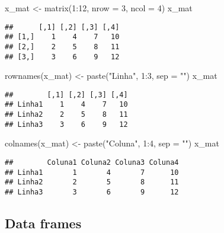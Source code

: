 \documentclass[
]{book}
\newenvironment{Shaded}{\begin{snugshade}}{\end{snugshade}}
\newcommand{\AttributeTok}[1]{\textcolor[rgb]{0.77,0.63,0.00}{#1}}
\newcommand{\DecValTok}[1]{\textcolor[rgb]{0.00,0.00,0.81}{#1}}
\newcommand{\FunctionTok}[1]{\textcolor[rgb]{0.00,0.00,0.00}{#1}}
\newcommand{\NormalTok}[1]{#1}
\newcommand{\OtherTok}[1]{\textcolor[rgb]{0.56,0.35,0.01}{#1}}
\newcommand{\SpecialCharTok}[1]{\textcolor[rgb]{0.00,0.00,0.00}{#1}}
\newcommand{\StringTok}[1]{\textcolor[rgb]{0.31,0.60,0.02}{#1}}
\begin{document}
\begin{Shaded}
\begin{Highlighting}[]
\NormalTok{x\_mat }\OtherTok{\textless{}{-}} \FunctionTok{matrix}\NormalTok{(}\DecValTok{1}\SpecialCharTok{:}\DecValTok{12}\NormalTok{, }\AttributeTok{nrow =} \DecValTok{3}\NormalTok{, }\AttributeTok{ncol =} \DecValTok{4}\NormalTok{)}
\NormalTok{x\_mat}
\end{Highlighting}
\end{Shaded}

\begin{verbatim}
##      [,1] [,2] [,3] [,4]
## [1,]    1    4    7   10
## [2,]    2    5    8   11
## [3,]    3    6    9   12
\end{verbatim}

\begin{Shaded}
\begin{Highlighting}[]
\FunctionTok{rownames}\NormalTok{(x\_mat) }\OtherTok{\textless{}{-}} \FunctionTok{paste}\NormalTok{(}\StringTok{"Linha"}\NormalTok{, }\DecValTok{1}\SpecialCharTok{:}\DecValTok{3}\NormalTok{, }\AttributeTok{sep =} \StringTok{""}\NormalTok{)}
\NormalTok{x\_mat}
\end{Highlighting}
\end{Shaded}

\begin{verbatim}
##        [,1] [,2] [,3] [,4]
## Linha1    1    4    7   10
## Linha2    2    5    8   11
## Linha3    3    6    9   12
\end{verbatim}

\begin{Shaded}
\begin{Highlighting}[]
\FunctionTok{colnames}\NormalTok{(x\_mat) }\OtherTok{\textless{}{-}} \FunctionTok{paste}\NormalTok{(}\StringTok{"Coluna"}\NormalTok{, }\DecValTok{1}\SpecialCharTok{:}\DecValTok{4}\NormalTok{, }\AttributeTok{sep =} \StringTok{""}\NormalTok{)}
\NormalTok{x\_mat}
\end{Highlighting}
\end{Shaded}

\begin{verbatim}
##        Coluna1 Coluna2 Coluna3 Coluna4
## Linha1       1       4       7      10
## Linha2       2       5       8      11
## Linha3       3       6       9      12
\end{verbatim}

\hypertarget{data-frames}{%
\subsection{Data frames}\label{data-frames}}
\end{document}
